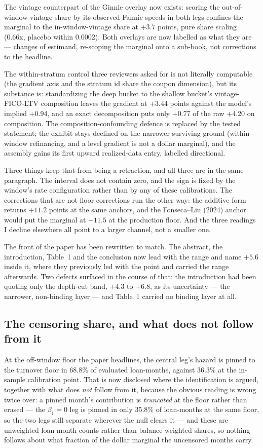 \documentclass[11pt]{article}
\begin{document}
The vintage counterpart of the Ginnie overlay now exists: scoring the
out-of-window vintage share by its observed Fannie speeds in both legs confines
the marginal to the in-window-vintage share at +3.7 points, pure share scaling
(0.66x, placebo within 0.0002). Both overlays are now labelled as what they
are --- changes of estimand, re-scoping the marginal onto a sub-book, not
corrections to the headline.

The within-stratum control three reviewers asked for is not literally
computable (the gradient axis and the stratum id share the coupon dimension),
but its substance is: standardizing the deep bucket to the shallow bucket's
vintage-FICO-LTV composition leaves the gradient at +3.44 points against the
model's implied +0.94, and an exact decomposition puts only +0.77 of the raw
+4.20 on composition. The composition-confounding defence is replaced by the
tested statement; the exhibit stays declined on the narrower surviving ground
(within-window refinancing, and a level gradient is not a dollar marginal),
and the assembly gains its first upward realized-data entry, labelled
directional.

Three things keep that from being a retraction, and all three are in the same
paragraph. The interval does not contain zero, and the sign is fixed by the window's
rate configuration rather than by any of these calibrations. The corrections that are
not floor corrections run the other way: the additive form returns $+11.2$ points at
the same anchors, and the Fonseca--Liu (2024) anchor would put the marginal at $+11.5$
at the production floor. And the three readings I decline elsewhere all point to a
larger channel, not a smaller one.

The front of the paper has been rewritten to match. The abstract, the introduction,
Table~1 and the conclusion now lead with the range and name $+5.6$ inside it, where
they previously led with the point and carried the range afterwards. Two defects
surfaced in the course of that: the introduction had been quoting only the depth-cut
band, $+4.3$ to $+6.8$, as its uncertainty --- the narrower, non-binding layer --- and
Table~1 carried no binding layer at all.

\subsection{The censoring share, and what does not follow from it}

At the off-window floor the paper headlines, the central leg's hazard is pinned to the
turnover floor in 68.8\% of evaluated loan-months, against 36.3\% at the in-sample
calibration point. That is now disclosed where the identification is argued, together
with what does \emph{not} follow from it, because the obvious reading is wrong twice
over: a pinned month's contribution is \emph{truncated} at the floor rather than
erased --- the $\beta_1 = 0$ leg is pinned in only 35.8\% of loan-months at the same
floor, so the two legs still separate wherever the null clears it --- and these are
unweighted loan-month counts rather than balance-weighted shares, so nothing follows
about what fraction of the dollar marginal the uncensored months carry.
\end{document}
